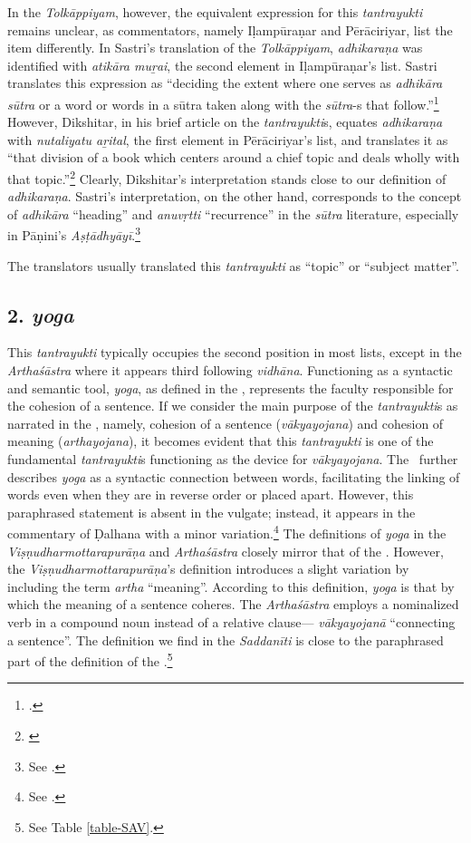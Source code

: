 In the \emph{Tolkāppiyam}, however, the equivalent expression for this 
\emph{tantrayukti} remains unclear, as commentators, namely Iḷampūraṇar and 
Pērāciriyar, list the item differently. In Sastri's translation of the 
\emph{Tolkāppiyam}, \emph{adhikaraṇa} was identified with \emph{atikāra 
mu\b{r}ai}, the second element in Iḷampūraṇar's list. Sastri translates this expression 
as “deciding the extent where one serves as \emph{adhikāra sūtra} or a word or 
words in a sūtra taken along with the \emph{sūtra}-s that 
follow.”\footnote{\cite[233]{sast-1936}.} However, Dikshitar, in his brief article 
on 
the \emph{tantrayukti}s, equates \emph{adhikaraṇa} with \emph{nutaliyatu 
a\b{r}ital}, the first element in Pērāciriyar's list, and translates it as “that division of a 
book which centers around a chief topic and deals wholly with that 
topic.”\footnote{\cite[85]{diks-1930}} Clearly, Dikshitar's interpretation stands 
close to our definition of \emph{adhikaraṇa}. Sastri's interpretation, on the other 
hand, corresponds to the concept of \emph{adhikāra} “heading” and 
\emph{anuvṛtti} “recurrence” in the \emph{sūtra} literature, especially in 
Pāṇini's 
\emph{Aṣṭādhyāyī}.\footnote{See \cite[111]{chev-2009}.} 

The translators usually translated this \emph{tantrayukti} as “topic” or “subject 
matter”. 

\subsection{2. \emph{yoga}}

This \emph{tantrayukti} typically occupies the second position in most lists, 
except in the \emph{Arthaśāstra} where it appears third following 
\emph{vidhāna}. Functioning as a syntactic and semantic tool, \emph{yoga}, as 
defined in the \SS, represents the faculty responsible for the cohesion of a 
sentence. If we consider the main purpose of the \emph{tantrayukti}s as 
narrated 
in the \SS, namely, cohesion of a sentence (\emph{vākyayojana}) and cohesion 
of 
meaning (\emph{arthayojana}), it becomes evident that this \emph{tantrayukti} 
is one of the fundamental \emph{tantrayukti}s functioning as the device for 
\emph{vākyayojana}. The \SS\ further describes \emph{yoga} as a syntactic 
connection between words, facilitating the linking of words even when they are in 
reverse order or placed apart. However, this paraphrased statement is absent in 
the 
vulgate; instead, it appears in the commentary of Ḍalhana with a minor 
variation.\footnote{See .} The definitions of \emph{yoga} in 
the 
\emph{Viṣṇudharmottarapurāṇa} and \emph{Arthaśāstra} closely mirror that of 
the \SS. However, the \emph{Viṣṇudharmottarapurāṇa}'s definition introduces a 
slight variation by including the term \emph{artha} “meaning”. According to this 
definition, \emph{yoga} is that by which the meaning of a sentence coheres. The 
\emph{Arthaśāstra} employs a nominalized verb in a compound noun instead of 
a 
relative clause--- \emph{vākyayojanā} “connecting a sentence”. The definition 
we 
find in the \emph{Saddanīti} is close to the paraphrased part of the definition of 
the \SS.\footnote{See Table \ref{table-SAV}.}

